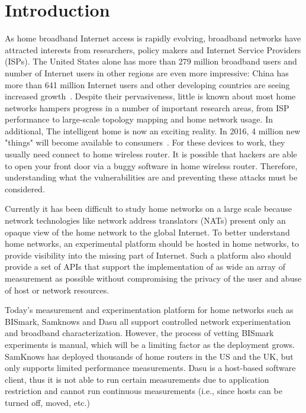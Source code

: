 \section{Introduction}
\label{sec.introduction}
As home broadband Internet access is rapidly evolving, broadband networks 
have attracted interests from researchers, policy makers and Internet 
Service Providers (ISPs). The United States alone has more than 279 million 
broadband users and number of Internet users in other regions are even more 
impressive: China has more than 641 million Internet users and other 
developing countries are seeing increased growth~\cite{asia}. Despite their 
pervasiveness, little is known about most home networks hampers progress in 
a number of important research areas, from ISP performance to large-scale 
topology mapping and home network usage. In additional, The intelligent home is now an exciting reality. In 2016, 4 million new "things" will become available to consumers~\cite{gartner}. For these devices to work, they usually need connect to home wireless router. It is possible that hackers are able to open your front door via a buggy software in home wireless router. Therefore, understanding what the vulnerabilities are and preventing these attacks must be considered.

Currently it has been difficult to study home networks on a large scale 
because network technologies like network address translators (NATs) present 
only an opaque view of the home network to the global Internet. To better 
understand home networks, an experimental platform should be hosted in home 
networks, to provide visibility into the missing part of Internet. Such a 
platform also should provide a set of APIs that support the implementation 
of as wide an array of measurement as possible without compromising the 
privacy of the user and abuse of host or network resources. 

Today's measurement and experimentation platform for home networks such as 
BISmark, Samknows and Dasu all support controlled network experimentation 
and broadband characterization. However, the process of vetting BISmark 
experiments is manual, which will be a limiting factor as the deployment 
grows. SamKnows has deployed thousands of home routers in the US and the UK, 
but only supports limited performance measurements. Dasu is a host-based 
software client, thus it is not able to run certain measurements due to 
application restriction and cannot run continuous measurements (i.e., since 
hosts can be turned off, moved, etc.)
 
